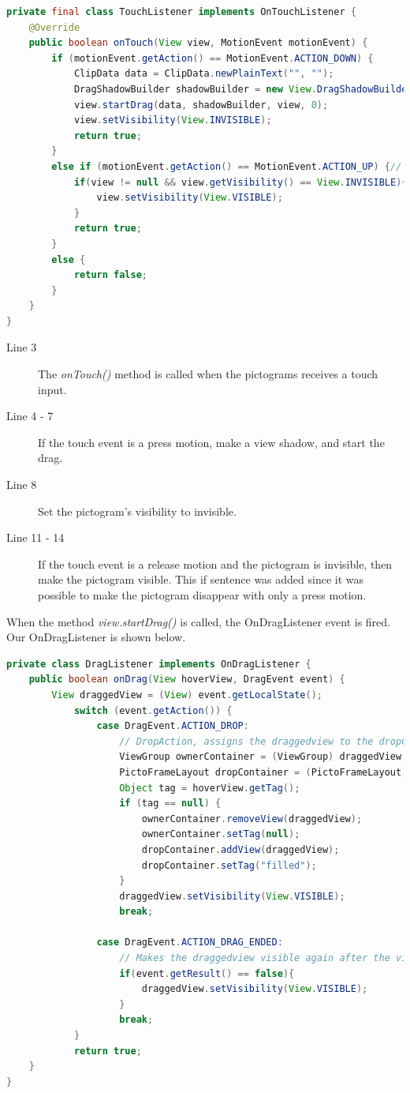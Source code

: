 \begin{lstlisting}[language=java,firstnumber=1,caption={Our TouchListener},label=lst:loadtexture] 
private final class TouchListener implements OnTouchListener {
	@Override
	public boolean onTouch(View view, MotionEvent motionEvent) {
		if (motionEvent.getAction() == MotionEvent.ACTION_DOWN) {
			ClipData data = ClipData.newPlainText("", "");
			DragShadowBuilder shadowBuilder = new View.DragShadowBuilder(view);
			view.startDrag(data, shadowBuilder, view, 0);
			view.setVisibility(View.INVISIBLE);
			return true;
		}
		else if (motionEvent.getAction() == MotionEvent.ACTION_UP) {// prevents that a pictogram disappears if only pressed and no drag
			if(view != null && view.getVisibility() == View.INVISIBLE){
				view.setVisibility(View.VISIBLE);
			}
			return true;
		}
		else {
			return false;
		}
	}
}
\end{lstlisting}
\begin{description}
\item[Line 3] The \textit{onTouch()} method is called when the pictograms receives a touch input.
\item[Line 4 - 7] If the touch event is a press motion, make a view shadow, and start the drag.
\item[Line 8] Set the pictogram's visibility to invisible.
\item[Line 11 - 14] If the touch event is a release motion and the pictogram is invisible, then make the pictogram visible. This if sentence was added since it was possible to make the pictogram disappear with only a press motion.
\end{description}
When the method \textit{view.startDrag()} is called, the OnDragListener event is fired. Our OnDragListener is shown below.
\begin{lstlisting}[language=java,firstnumber=1,caption={Our TouchListener},label=lst:loadtexture] 
private class DragListener implements OnDragListener {
	public boolean onDrag(View hoverView, DragEvent event) {
	    View draggedView = (View) event.getLocalState();
			switch (event.getAction()) {
				case DragEvent.ACTION_DROP:
					// DropAction, assigns the draggedview to the dropContainer if, the dropContainer does not already contain a pictogram.
					ViewGroup ownerContainer = (ViewGroup) draggedView.getParent();
					PictoFrameLayout dropContainer = (PictoFrameLayout) hoverView;
					Object tag = hoverView.getTag();
					if (tag == null) {
						ownerContainer.removeView(draggedView);
						ownerContainer.setTag(null);
						dropContainer.addView(draggedView);
						dropContainer.setTag("filled");
					}
					draggedView.setVisibility(View.VISIBLE);
					break;

				case DragEvent.ACTION_DRAG_ENDED:
					// Makes the draggedview visible again after the view has been moved or if drop wasn't valid.
					if(event.getResult() == false){
						draggedView.setVisibility(View.VISIBLE);
					}
					break;
			}
			return true;
	}
}
\end{lstlisting}

